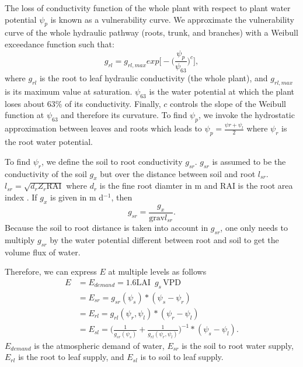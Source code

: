 \documentclass[utf8]{frontiersSCNS} %
\begin{document}
The loss of conductivity function of the whole plant with respect to plant water potential $\psi_p$ is known as a vulnerability curve. We approximate the vulnerability curve of the whole hydraulic pathway (roots, trunk, and branches) with a Weibull exceedance function such that:
\begin{equation}
    \label{eqn:root_leaf}
    g_{rl} = g_{rl,max}exp\Big[-\Big(\frac{\psi_{p}}{\psi_{63}}\Big)^c\Big],
\end{equation}
where $g_{rl}$ is the root to leaf hydraulic conductivity (the whole plant), and $g_{rl,max}$ is its maximum value at saturation. $\psi_{63}$ is the water potential at which the plant loses about 63\% of its conductivity. Finally, $c$ controls the slope of the Weibull function at $\psi_{63}$ and therefore its curvature. To find $\psi_{p}$, we invoke the hydrostatic approximation between leaves and roots which leads to $\psi_{p}=\frac{\psi{r}+\psi_l}{2}$ where $\psi_r$ is the root water potential.

To find $\psi_r$, we define the soil to root conductivity $g_{sr}$. $g_{sr}$ is assumed to be the conductivity of the soil $g_x$ but over the distance between soil and root $l_{sr}$. $l_{sr} = \sqrt{d_r Z_r \text{RAI}}$ where $d_r$ is the fine root diamter in m and RAI is the root area index \citep{Manzoni2013}. If $g_x$ is given in m d$^{-1}$, then
\begin{equation}
    \label{eqn:soil_root}
    g_{sr} = \frac{g_x}{\text{grav} l_{sr}}. 
\end{equation}
Because the soil to root distance is taken into account in $g_{sr}$, one only needs to multiply $g_{sr}$ by the water potential different between root and soil to get the volume flux of water.

Therefore, we can express $E$ at multiple levels as follows
\begin{equation}
    \label{eqn: mass_cons}
        \begin{split}
        E & = E_{demand} = 1.6 \text{LAI }\, g_s\, \text{VPD} \\
        & = E_{sr} = g_{sr}(\psi_s)*(\psi_s - \psi_r)\\
        & = E_{rl} = g_{rl}(\psi_r,\psi_l)*(\psi_r - \psi_l) \\
        & = E_{sl} = \Bigg(\frac{1}{g_{sr}(\psi_s)} + \frac{1}{g_{rl}(\psi_r,\psi_l)}\Bigg)^{-1}*(\psi_s - \psi_l).
        \end{split}
\end{equation}
$E_{demand}$ is the atmospheric demand of water, $E_{sr}$ is the soil to root water supply, $E_{rl}$ is the root to leaf supply, and $E_{sl}$ is to soil to leaf supply.
\end{document}
